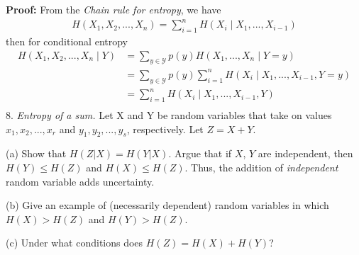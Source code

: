 \documentclass[12pt]{article}
\begin{document}
	\textbf{Proof:} From the \textit{Chain rule for entropy}, we have
	\begin{align*}
		H(X_1,X_2,...,X_n) = \sum_{i=1}^{n}H(X_i\mid X_1,...,X_{i-1})
	\end{align*}
	then for conditional entropy
	\begin{align*}
		H(X_1,X_2,...,X_n\mid Y)  &= \sum_{y\in\mathcal{Y}}p(y)H(X_1,...,X_n\mid Y=y) \\
								  &= \sum_{y\in\mathcal{Y}}p(y)\sum_{i=1}^{n}H(X_i\mid X_1,...,X_{i-1}, Y=y) \\
								  &= \sum_{i=1}^{n}H(X_i\mid X_1,...,X_{i-1},Y)\\
	\end{align*}
	8. \textit{Entropy of a sum.} Let X and Y be random variables that take on values $x_1,x_2,...,x_r$ and $y_1,y_2,...,y_s$, respectively. Let $Z = X + Y$.\par 
	(a) Show that $H(Z|X) = H(Y|X)$. Argue that if $X$, $Y$ are independent, then $H(Y) \leq H(Z)$ and $H(X) \leq H(Z)$. Thus, the addition of \textit{independent} random variable adds uncertainty. \par 
	(b) Give an example of (necessarily dependent) random variables in which $H(X) > H(Z)$ and $H(Y) > H(Z)$. \par 
	(c) Under what conditions does $H(Z) = H(X) + H(Y)$? \\
	
\end{document}
